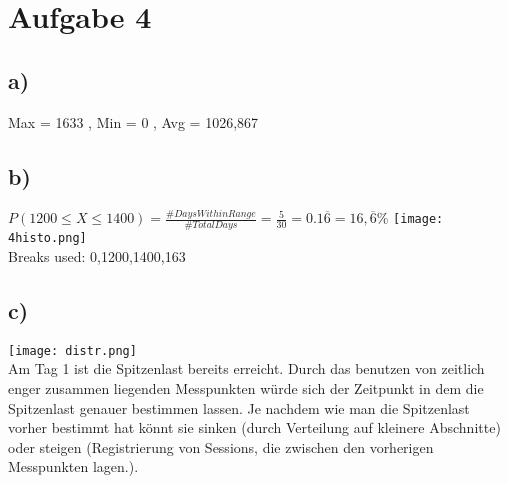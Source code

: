\section*{Aufgabe 4}

	\subsection*{a)}
	 \begin{center}
	 	Max = 1633 , Min = 0 , Avg = 1026,867
	 \end{center}
	\subsection*{b)}
		\centering
		$P(1200 \leq X \leq 1400) = \frac{\#DaysWithinRange}{\#TotalDays}=\frac{5}{30} = 0.1\overline{6} = 16,\overline{6}\%$ 
		\texttt{[image: 4histo.png]}\\
		Breaks used: 0,1200,1400,163
	\newpage
	\subsection*{c)}
		\texttt{[image: distr.png]}\\
		Am Tag 1 ist die Spitzenlast bereits erreicht.
		Durch das benutzen von zeitlich enger zusammen liegenden Messpunkten würde sich der Zeitpunkt in dem die Spitzenlast genauer bestimmen lassen. Je nachdem wie man die Spitzenlast vorher bestimmt hat könnt sie sinken (durch Verteilung auf kleinere Abschnitte) oder steigen (Registrierung von Sessions, die zwischen den vorherigen Messpunkten lagen.).
		
		
	
	
	
	
	
	
	
	
